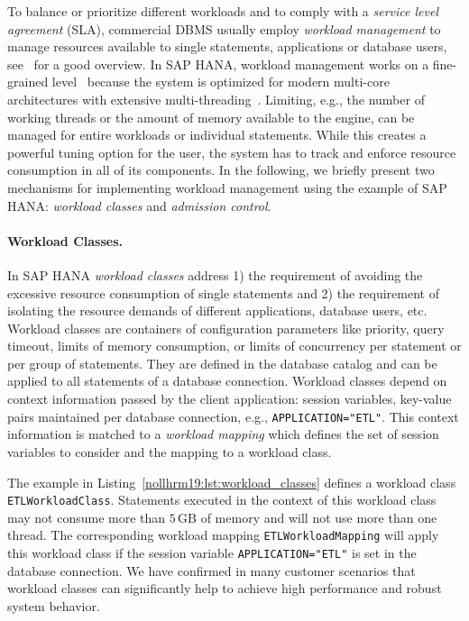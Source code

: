 \documentclass[11pt,dvipdfm]{article}
\begin{document}
To balance or prioritize different workloads and to comply with a \emph{service level agreement} (SLA), commercial DBMS usually employ \emph{workload management} to manage resources available to single statements, applications or database users, see~\cite{nollhrm19:Zhang:AWLM:2014} for a good overview.
In SAP HANA, workload management works on a fine-grained level~\cite{nollhrm19:HANA:2018:AdminGuide} because the system is optimized for modern multi-core architectures with extensive multi-threading~\cite{nollhrm19:Psaroudakis:2015:SUC:2824032.2824043}.
Limiting, e.g., the number of working threads or the amount of memory available to the engine, can be managed for entire workloads or individual statements.
While this creates a powerful tuning option for the user, the system has to track and enforce resource consumption in all of its components.
In the following, we briefly present two mechanisms for implementing workload management using the example of SAP HANA: \emph{workload classes} and \emph{admission control}.

\paragraph{Workload Classes.}
In SAP HANA \emph{workload classes} address 1) the requirement of avoiding the excessive resource consumption of single statements and 2) the requirement of isolating the resource demands of different applications, database users, etc.\@
Workload classes are containers of configuration parameters like priority, query timeout, limits of memory consumption, or limits of concurrency per statement or per group of statements.
They are defined in the database catalog and can be applied to all statements of a database connection.
Workload classes depend on context information passed by the client application: session variables, key-value pairs maintained per database connection, e.g., \texttt{APPLICATION="ETL"}.
This context information is matched to a \emph{workload mapping} which defines the set of session variables to consider and the mapping to a workload class.

The example in Listing~\ref{nollhrm19:lst:workload_classes} defines a workload class \texttt{ETLWorkloadClass}.
Statements executed in the context of this workload class may not consume more than $5\,\mathrm{GB}$ of memory and will not use more than one thread.
The corresponding workload mapping \texttt{ETLWorkloadMapping} will apply this workload class if the session variable \texttt{APPLICATION="ETL"} is set in the database connection.
We have confirmed in many customer scenarios that workload classes can significantly help to achieve high performance and robust system behavior.
\end{document}
